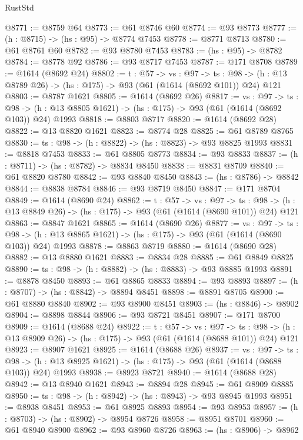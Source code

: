 \begin{lexlean}{RustStd}
\begin{coremodule}
@8771 := @8759 @64
@8773 := @61 @8746 @60
@8774 := @93 @8773
@8777 := (h : @8715) -> (hs : @95) -> @8774 @7453
@8778 := @8771 @8713
@8780 := @61 @8761 @60
@8782 := @93 @8780 @7453
@8783 := (hs : @95) -> @8782
@8784 := @8778 @92
@8786 := @93 @8717 @7453
@8787 := @171 @8708
@8789 := @1614 (@8692 @24)
@8802 := {t : @57} ->
  {vs : @97} ->
  {ts : @98} -> (h : @13 @8789 @26) -> (hs : @175) -> @93 (@61 (@1614 (@8692 @101)) @24) @121
@8803 := @8787 @1621
@8805 := @1614 (@8692 @26)
@8817 := {vs : @97} ->
  {ts : @98} -> (h : @13 @8805 @1621) -> (hs : @175) -> @93 (@61 (@1614 (@8692 @103)) @24) @1993
@8818 := @8803 @8717
@8820 := @1614 (@8692 @28)
@8822 := @13 @8820 @1621
@8823 := @8774 @28
@8825 := @61 @8789 @8765
@8830 := {ts : @98} -> (h : @8822) -> (hs : @8823) -> @93 @8825 @1993
@8831 := @8818 @7453
@8833 := @61 @8805 @8773
@8834 := @93 @8833
@8837 := (h : @8711) -> (hs : @8782) -> @8834 @8450
@8838 := @8831 @8709
@8840 := @61 @8820 @8780
@8842 := @93 @8840 @8450
@8843 := (hs : @8786) -> @8842
@8844 := @8838 @8784
@8846 := @93 @8719 @8450
@8847 := @171 @8704
@8849 := @1614 (@8690 @24)
@8862 := {t : @57} ->
  {vs : @97} ->
  {ts : @98} -> (h : @13 @8849 @26) -> (hs : @175) -> @93 (@61 (@1614 (@8690 @101)) @24) @121
@8863 := @8847 @1621
@8865 := @1614 (@8690 @26)
@8877 := {vs : @97} ->
  {ts : @98} -> (h : @13 @8865 @1621) -> (hs : @175) -> @93 (@61 (@1614 (@8690 @103)) @24) @1993
@8878 := @8863 @8719
@8880 := @1614 (@8690 @28)
@8882 := @13 @8880 @1621
@8883 := @8834 @28
@8885 := @61 @8849 @8825
@8890 := {ts : @98} -> (h : @8882) -> (hs : @8883) -> @93 @8885 @1993
@8891 := @8878 @8450
@8893 := @61 @8865 @8833
@8894 := @93 @8893
@8897 := (h : @8707) -> (hs : @8842) -> @8894 @8451
@8898 := @8891 @8705
@8900 := @61 @8880 @8840
@8902 := @93 @8900 @8451
@8903 := (hs : @8846) -> @8902
@8904 := @8898 @8844
@8906 := @93 @8721 @8451
@8907 := @171 @8700
@8909 := @1614 (@8688 @24)
@8922 := {t : @57} ->
  {vs : @97} ->
  {ts : @98} -> (h : @13 @8909 @26) -> (hs : @175) -> @93 (@61 (@1614 (@8688 @101)) @24) @121
@8923 := @8907 @1621
@8925 := @1614 (@8688 @26)
@8937 := {vs : @97} ->
  {ts : @98} -> (h : @13 @8925 @1621) -> (hs : @175) -> @93 (@61 (@1614 (@8688 @103)) @24) @1993
@8938 := @8923 @8721
@8940 := @1614 (@8688 @28)
@8942 := @13 @8940 @1621
@8943 := @8894 @28
@8945 := @61 @8909 @8885
@8950 := {ts : @98} -> (h : @8942) -> (hs : @8943) -> @93 @8945 @1993
@8951 := @8938 @8451
@8953 := @61 @8925 @8893
@8954 := @93 @8953
@8957 := (h : @8703) -> (hs : @8902) -> @8954 @8726
@8958 := @8951 @8701
@8960 := @61 @8940 @8900
@8962 := @93 @8960 @8726
@8963 := (hs : @8906) -> @8962

\end{coremodule}
\end{lexlean}
